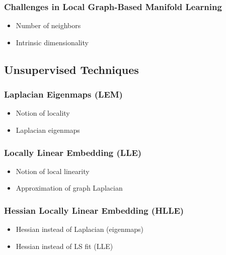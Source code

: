 
\subsubsection{Challenges in Local Graph-Based Manifold Learning}
\label{challenges}

\begin{itemize}
  \item Number of neighbors
  \item Intrinsic dimensionality
\end{itemize}


\subsection{Unsupervised Techniques}
\label{techniques}


\subsubsection{Laplacian Eigenmaps (LEM)}
\label{laplace}

\begin{itemize}
  \item Notion of locality
  \item Laplacian eigenmaps
\end{itemize}


\subsubsection{Locally Linear Embedding (LLE)}
\label{lle}

\begin{itemize}
  \item Notion of local linearity
  \item Approximation of graph Laplacian
\end{itemize}



\subsubsection{Hessian Locally Linear Embedding (HLLE)}
\label{hlle}

\begin{itemize}
  \item Hessian instead of Laplacian (eigenmaps)
  \item Hessian instead of LS fit (LLE)
\end{itemize}
